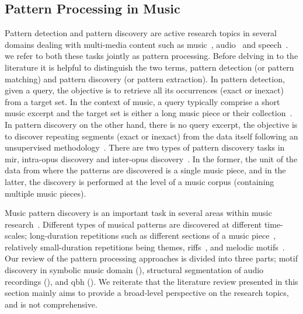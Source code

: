 \subsection{Pattern Processing in Music}
\label{sec:pattern_processin_in_music}

Pattern detection and pattern discovery are active research topics in several domains dealing with multi-media content such as music~\citep{klapuri2010pattern}, audio~\citep{Herley2006} and speech~\citep{Park2008}. we refer to both these tasks jointly as pattern processing. Before delving in to the literature it is helpful to distinguish the two terms, pattern detection (or pattern matching) and pattern discovery (or pattern extraction). In pattern detection, given a query, the objective is to retrieve all its occurrences (exact or inexact) from a target set. In the context of music, a query typically comprise a short music excerpt and the target set is either a long music piece or their collection~\citep{ghias1995query}. In pattern discovery on the other hand, there is no query excerpt, the objective is to discover repeating segments (exact or inexact) from the data itself following an unsupervised methodology~\citep{dannenberg2003pattern}. There are two types of pattern discovery tasks in \gls{mir}, intra-opus discovery and inter-opus discovery~\citep{conklin2001representation}. In the former,\textsl{} the unit of the data from where the patterns are discovered is a single music piece, and in the latter, the discovery is performed at the level of a music corpus (containing multiple music pieces).

Music pattern discovery is an important task in several areas within music research~\citep{collins2011modeling,Conklin2010a,Serra2014,nieto2012compressing}. Different types of musical patterns are discovered at different time-scales; long-duration repetitions such as different sections of a music piece~\citep{serra2012unsupervised,Goto06TASLP}, relatively small-duration repetitions being themes, riffs~\citep{Hsu2001a}, and melodic motifs~\citep{collins2011improved}. Our review of the pattern processing approaches is divided into three parts; motif discovery in symbolic music domain (), structural segmentation of audio recordings (), and \gls{qbh} (). We reiterate that the literature review presented in this section mainly aims to provide a broad-level perspective on the research topics, and is not comprehensive.

